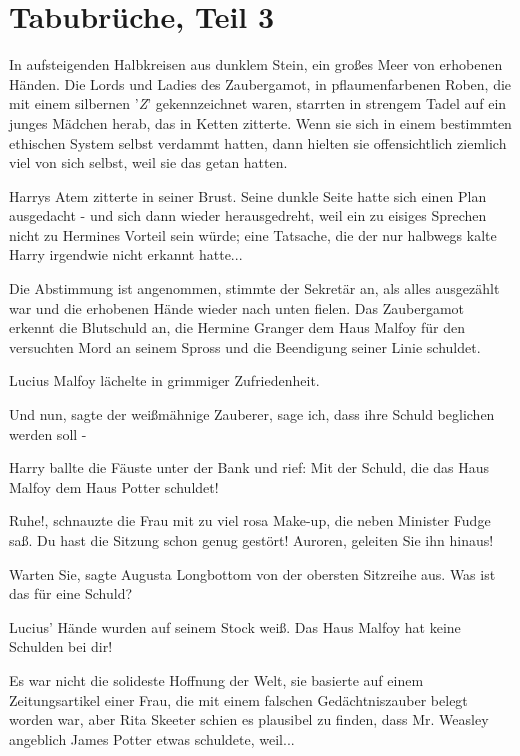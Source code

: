 \chapter{Tabubrüche, Teil 3}

In aufsteigenden Halbkreisen aus dunklem Stein, ein großes Meer von erhobenen
Händen. Die Lords und Ladies des Zaubergamot, in pflaumenfarbenen Roben, die mit
einem silbernen '\emph{Z}' gekennzeichnet waren, starrten in strengem Tadel auf
ein junges Mädchen herab, das in Ketten zitterte. Wenn sie sich in einem
bestimmten ethischen System selbst verdammt hatten, dann hielten sie
offensichtlich ziemlich viel von sich selbst, weil sie das getan hatten.

Harrys Atem zitterte in seiner Brust. Seine dunkle Seite hatte sich einen Plan
ausgedacht - und sich dann wieder herausgedreht, weil ein zu eisiges Sprechen
nicht zu Hermines Vorteil sein würde; eine Tatsache, die der nur halbwegs kalte
Harry irgendwie nicht erkannt hatte...

\glqq{}Die Abstimmung ist angenommen\grqq{}, stimmte der Sekretär an, als alles
ausgezählt war und die erhobenen Hände wieder nach unten fielen. \glqq{}Das
Zaubergamot erkennt die Blutschuld an, die Hermine Granger dem Haus Malfoy für
den versuchten Mord an seinem Spross und die Beendigung seiner Linie
schuldet.\grqq{}

Lucius Malfoy lächelte in grimmiger Zufriedenheit.

\glqq{}Und nun\grqq{}, sagte der weißmähnige Zauberer, \glqq{}sage ich, dass ihre
Schuld beglichen werden soll -\grqq{}

Harry ballte die Fäuste unter der Bank und rief: \glqq{}Mit der Schuld, die das
Haus Malfoy dem Haus Potter schuldet!\grqq{}

\glqq{}Ruhe!\grqq{}, schnauzte die Frau mit zu viel rosa Make-up, die neben
Minister Fudge saß. \glqq{}Du hast die Sitzung schon genug gestört! Auroren,
geleiten Sie ihn hinaus!\grqq{}

\glqq{}Warten Sie\grqq{}, sagte Augusta Longbottom von der obersten Sitzreihe
aus. \glqq{}Was ist das für eine Schuld?\grqq{}

Lucius' Hände wurden auf seinem Stock weiß. \glqq{}Das Haus Malfoy hat keine
Schulden bei dir!\grqq{}

Es war nicht die solideste Hoffnung der Welt, sie basierte auf einem
Zeitungsartikel einer Frau, die mit einem falschen Gedächtniszauber belegt
worden war, aber Rita Skeeter schien es plausibel zu finden, dass Mr. Weasley
angeblich James Potter etwas schuldete, weil...

